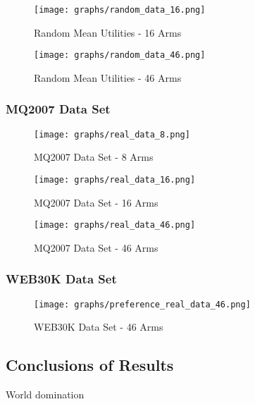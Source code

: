 \documentclass{llncs}
\begin{document}
\begin{figure}[h!]
\centering
  \texttt{[image: graphs/random\_data\_16.png]}
  \caption{Random Mean Utilities - 16 Arms}
\end{figure}

\begin{figure}[h!]
\centering
  \texttt{[image: graphs/random\_data\_46.png]}
  \caption{Random Mean Utilities - 46 Arms}
\end{figure}

\subsubsection{MQ2007 Data Set}

\begin{figure}[h!]
\centering
  \texttt{[image: graphs/real\_data\_8.png]}
  \caption{MQ2007 Data Set - 8 Arms}
\end{figure}

\begin{figure}[h!]
\centering
  \texttt{[image: graphs/real\_data\_16.png]}
  \caption{MQ2007 Data Set - 16 Arms}
\end{figure}

\begin{figure}[h!]
\centering
  \texttt{[image: graphs/real\_data\_46.png]}
  \caption{MQ2007 Data Set - 46 Arms}
\end{figure}

\subsubsection{WEB30K Data Set}
\begin{figure}[h!]
\centering
  \texttt{[image: graphs/preference\_real\_data\_46.png]}
  \caption{WEB30K Data Set - 46 Arms}
\end{figure}

\subsection{Conclusions of Results}
World domination
\end{document}
